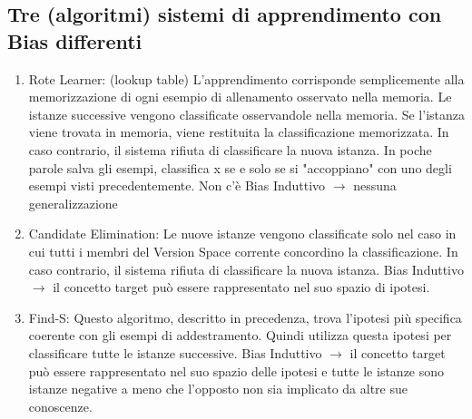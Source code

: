\documentclass{article}
\begin{document}
\subsection{Tre (algoritmi) sistemi di apprendimento con Bias differenti}
\begin{enumerate}
    \item Rote Learner: (lookup table) L'apprendimento corrisponde semplicemente alla memorizzazione di ogni esempio di allenamento osservato nella memoria. Le istanze successive vengono classificate osservandole nella memoria. Se l'istanza viene trovata in memoria, viene restituita la classificazione memorizzata. In caso contrario, il sistema rifiuta di classificare la nuova istanza. In poche parole salva gli esempi, classifica x se e solo se si "accoppiano" con uno degli esempi visti precedentemente. \newline 
    Non c'è Bias Induttivo $\rightarrow$ nessuna generalizzazione
    \item Candidate Elimination: Le nuove istanze vengono classificate solo nel caso in cui tutti i membri del Version Space corrente concordino la classificazione. In caso contrario, il sistema rifiuta di classificare la nuova istanza. \newline 
    Bias Induttivo $\rightarrow$ il concetto target può essere rappresentato nel suo spazio di ipotesi. 
    \item Find-S: Questo algoritmo, descritto in precedenza, trova l'ipotesi più specifica coerente con gli esempi di addestramento. Quindi utilizza questa ipotesi per classificare tutte le istanze successive. \newline
    Bias Induttivo $\rightarrow$ il concetto target può essere rappresentato nel suo spazio delle ipotesi e tutte le istanze sono istanze negative a meno che l'opposto non sia implicato da altre sue conoscenze.
\end{enumerate}
\clearpage
\end{document}
